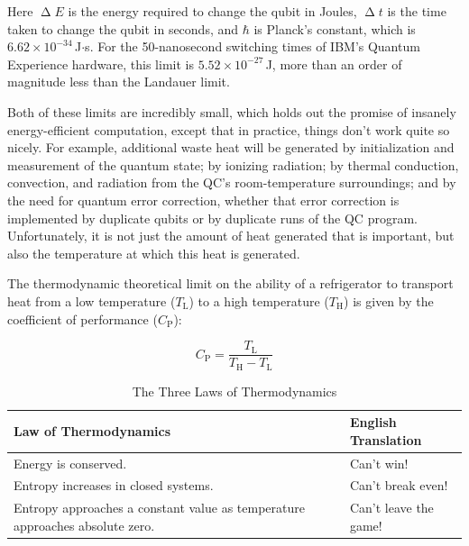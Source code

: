 Here $\upDelta E$ is the energy required to change the qubit in Joules,
$\upDelta t$ is the time taken to change the qubit in seconds, and
$\hbar$ is Planck's constant, which is $6.62 \times 10^{-34}$\,J$\cdot$s.
For the 50-nanosecond switching times of IBM's Quantum Experience
hardware, this limit is $5.52 \times 10^{-27}$\,J, more than an order
of magnitude less than the Landauer limit.

Both of these limits are incredibly small, which holds out the promise
of insanely energy-efficient computation, except that
in practice, things don't work quite so nicely.
For example, additional waste heat will be generated
by initialization and measurement of the quantum state;
by ionizing radiation;
by thermal conduction, convection, and radiation from
the QC's room-temperature surroundings;
and
by the need for quantum error correction, whether that error correction
is implemented by duplicate qubits or by duplicate runs of the QC
program.
Unfortunately, it is not just the amount of heat generated that is
important, but also the temperature at which this heat is generated.

\newcommand{\TLo}{T_\mathrm{L}}
\newcommand{\THi}{T_\mathrm{H}}
\newcommand{\CPf}{C_\mathrm{P}}

The thermodynamic theoretical limit on the ability of a refrigerator
to transport heat from a low temperature ($\TLo$) to a high temperature
($\THi$) is given by the coefficient of performance ($\CPf$):

\begin{equation}
	\CPf = \frac{\TLo}{\THi - \TLo}
\end{equation}

\begin{table}
\renewcommand*{\arraystretch}{1.25}
\centering\footnotesize
\begin{tabular}{p{1.7in}p{0.95in}}
\toprule
Law of Thermodynamics
	& English Translation \\
\midrule
Energy is conserved.
	& Can't win! \\
Entropy increases in closed systems.
	& Can't break even! \\
Entropy approaches a constant value as temperature approaches absolute zero.
	& Can't leave the game! \\
\bottomrule
\end{tabular}
\caption{The Three Laws of Thermodynamics}
\label{tab:future:The Three Laws of Thermodynamics}
\end{table}

